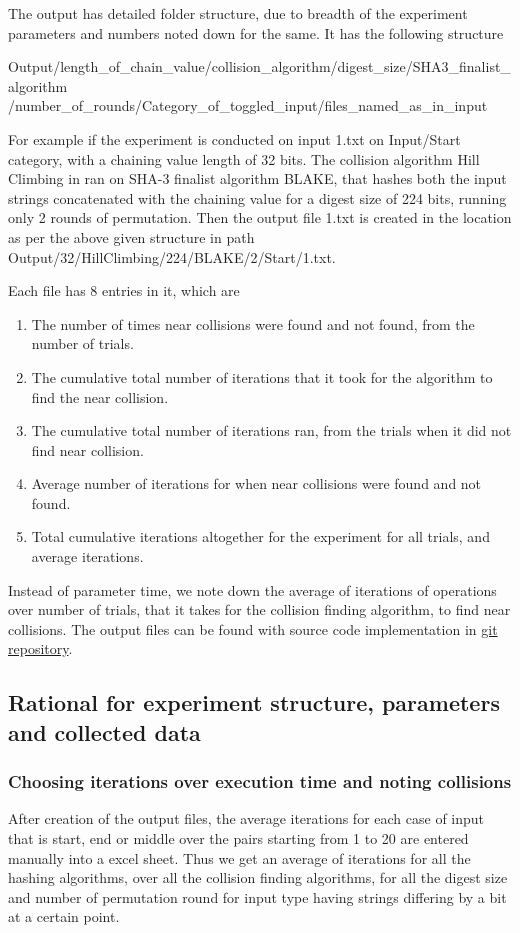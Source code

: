 The output has detailed folder structure, due to breadth of the experiment parameters and numbers noted down for
the same. It has the following structure
\begin{center}Output/length\_of\_chain\_value/collision\_algorithm/digest\_size/SHA3\_finalist\_algorithm
/number\_of\_rounds/Category\_of\_toggled\_input/files\_named\_as\_in\_input\end{center}

For example if the experiment is conducted on input 1.txt on Input/Start category, with a chaining value length of 
32 bits. The collision algorithm Hill Climbing in ran on SHA-3 finalist algorithm BLAKE, that hashes both the input 
strings concatenated with the chaining value for a digest size of 224 bits, running only 2 rounds of permutation.
Then the output file 1.txt is created in the location as per the above given structure in path 
Output/32/HillClimbing/224/BLAKE/2/Start/1.txt.

Each file has 8 entries in it, which are 
\begin{enumerate}
\item The number of times near collisions were found and not found, from the number of trials.
\item The cumulative total number of iterations that it took for the algorithm to find the near collision.
\item The cumulative total number of iterations ran, from the trials when it did not find near collision.
\item Average number of iterations for when near collisions were found and not found.
\item Total cumulative iterations altogether for the experiment for all trials, and average iterations.
\end{enumerate}

Instead of parameter time, we note down the average of iterations of operations over number of trials, that it
takes for the collision finding algorithm, to find near collisions. The output files can be found with source code
implementation in \href{"https://github.com/sxs9174/MSProjectCode/tree/master/MSProjectCode/Output"}
{git repository}.

\subsection{Rational for experiment structure, parameters and collected data}

\subsubsection{Choosing iterations over execution time and noting collisions}
After creation of the output files, the average iterations for each case of input that is start, end or middle
over the pairs starting from 1 to 20 are entered manually into a excel sheet. Thus we get an average of iterations
for all the hashing algorithms, over all the collision finding algorithms, for all the digest size and number of
permutation round for input type having strings differing by a bit at a certain point.

